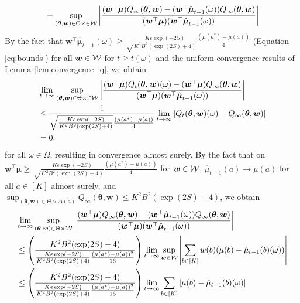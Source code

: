 \documentclass{article}
\begin{document}
\begin{appendices}
\begin{align}
    &\quad + \sup_{(\boldsymbol\theta,\boldsymbol{w}) \in \Theta \times \in \mathcal{W}} \left|\frac{(\boldsymbol{w}^\top \boldsymbol{\mu})Q_\infty(\boldsymbol{\theta, \boldsymbol{w}}) - (\boldsymbol{w}^\top\hat{\boldsymbol{\mu}}_{t-1}(\omega))Q_\infty(\boldsymbol{\theta}, \boldsymbol{w})}{(\boldsymbol{w}^\top\boldsymbol{\mu})(\boldsymbol{w}^\top\hat{\boldsymbol{\mu}}_{t-1}(\omega)) }\right|
\end{align}
By the fact that $\bm{w}^\top \bm{\hat\mu}_{t-1}(\omega) \geq \sqrt\frac{K\epsilon\exp(-2S)}{K^2B^2(\exp(2S)+4)}\frac{(\mu(a^*)-\mu(a))}{4}$ (Equation \eqref{eq:bounds}) for all $\boldsymbol{w} \in \mathcal{W}$ for $t \geq t(\omega)$ and the uniform convergence results of Lemma \ref{lem:convergence_q}, we obtain
\begin{align}
    &\lim_{t \rightarrow \infty}\sup_{(\boldsymbol\theta,\boldsymbol{w}) \in \Theta \times \in \mathcal{W}} \left|\frac{(\boldsymbol{w}^\top \boldsymbol{\mu})Q_t(\boldsymbol{\theta, \boldsymbol{w}})(\omega) - (\boldsymbol{w}^\top\boldsymbol{\mu})Q_\infty(\boldsymbol{\theta}, \boldsymbol{w})}{(\boldsymbol{w}^\top\boldsymbol{\mu})(\boldsymbol{w}^\top\hat{\boldsymbol{\mu}}_{t-1}(\omega)) }\right|\\
    &\leq \frac{1}{\sqrt\frac{K\epsilon\exp(-2S)}{K^2B^2(\exp(2S)+4)}\frac{(\mu(a^*)-\mu(a))}{4}}\lim_{t \rightarrow \infty} |Q_t(\boldsymbol{\theta}, \boldsymbol{w})(\omega) - Q_\infty(\boldsymbol\theta, \boldsymbol{w})|\\
    &= 0.
\end{align}
for all $\omega \in \Omega$, resulting in convergence almost surely. By the fact that on $\bm{w}^\top {\bm{\mu}} \geq \sqrt\frac{K\epsilon\exp(-2S)}{K^2B^2(\exp(2S)+4)}\frac{(\mu(a^*)-\mu(a))}{4}$ for $\boldsymbol{w} \in \mathcal{W}$, $\hat\mu_{t-1}(a) \rightarrow \mu(a)$ for all $a \in [K]$ almost surely, and $\sup_{(\bm{\theta}, \bm{w}) \in \Theta \times \Delta(a) } Q_\infty(\bm{\theta}, \bm{w}) \leq K^2B^2(\exp(2S)+4)$, we obtain
\begin{align}
    &\lim_{t \rightarrow \infty}\sup_{(\bm\theta, \bm{w}) \in \Theta \times \Wcal} \left|\frac{(\bm{w}^\top \bm{\mu})Q_\infty(\bm{\theta, \bm{w}}) - (\bm{w}^\top\hat{\bm{\mu}}_{t-1}(\omega))Q_\infty(\bm{\theta}, \bm{w})}{(\bm{w}^\top\bm{\mu})(\bm{w}^\top\hat{\bm{\mu}}_{t-1}(\omega)) }\right|\\
    &\leq \left(\frac{K^2B^2(\exp(2S)+4)}{\frac{K\epsilon\exp(-2S)}{K^2B^2(\exp(2S)+4)}\frac{(\mu(a^*)-\mu(a))^2}{16}}\right) \lim_{t \rightarrow \infty}\sup_{\bm{w} \in \Wcal}\left| \sum_{b \in [K]} w(b)(\mu(b)-\hat\mu_{t-1}(b)(\omega)) \right|\\
    & \leq \left(\frac{K^2B^2(\exp(2S)+4)}{\frac{K\epsilon\exp(-2S)}{K^2B^2(\exp(2S)+4)}\frac{(\mu(a^*)-\mu(a))^2}{16}}\right) \lim_{t \rightarrow \infty}\sum_{b \in [K]} \left|\mu(b) - \hat\mu_{t-1}(b)(\omega) \right|\\

\end{align}
\end{appendices}
\end{document}
